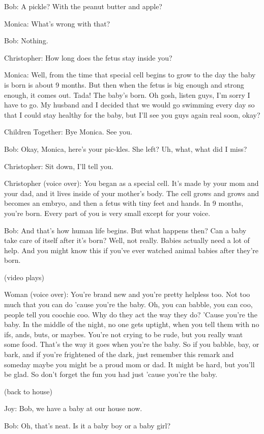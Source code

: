 Bob: A pickle? With the peanut butter and apple?

Monica: What's wrong with that?

Bob: Nothing.

Christopher: How long does the fetus stay inside you?

Monica: Well, from the time that special cell begins to grow to the day the baby is born is about 9 months. But then when the fetus is big enough and strong enough, it comes out. Tada! The baby's born. Oh gosh, listen guys, I'm sorry I have to go. My husband and I decided that we would go swimming every day so that I could stay healthy for the baby, but I'll see you guys again real soon, okay?

Children Together: Bye Monica. See you.

Bob: Okay, Monica, here's your pic-kles. She left? Uh, what, what did I miss?

Christopher: Sit down, I'll tell you.

Christopher (voice over): You began as a special cell. It's made by your mom and your dad, and it lives inside of your mother's body. The cell grows and grows and becomes an embryo, and then a fetus with tiny feet and hands. In 9 months, you're born. Every part of you is very small except for your voice.

Bob: And that's how human life begins. But what happens then? Can a baby take care of itself after it's born? Well, not really. Babies actually need a lot of help. And you might know this if you've ever watched animal babies after they're born.

(video plays)

Woman (voice over): You're brand new and you're pretty helpless too. Not too much that you can do 'cause you're the baby. Oh, you can babble, you can coo, people tell you coochie coo. Why do they act the way they do? 'Cause you're the baby. In the middle of the night, no one gets uptight, when you tell them with no ifs, ands, buts, or maybes. You're not crying to be rude, but you really want some food. That's the way it goes when you're the baby. So if you babble, bay, or bark, and if you're frightened of the dark, just remember this remark and someday maybe you might be a proud mom or dad. It might be hard, but you'll be glad. So don't forget the fun you had just 'cause you're the baby.

(back to house)

Joy: Bob, we have a baby at our house now.

Bob: Oh, that's neat. Is it a baby boy or a baby girl?

